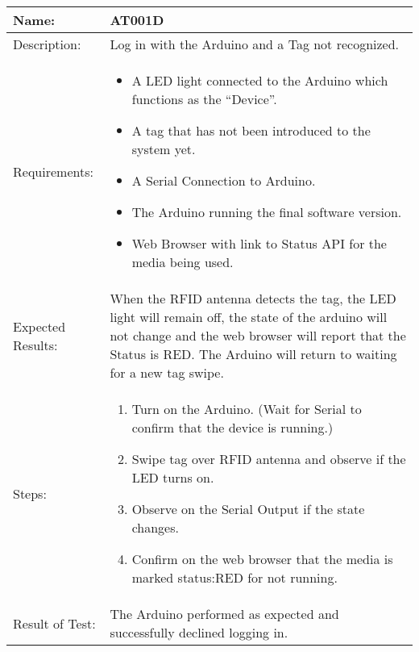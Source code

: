 \begin{table}[h]
	\centering
		\begin{tabular}{|l|p{9cm}|}
		\hline
		\hline
		Name: & AT001D\\
		\hline
		Description: & Log in with the Arduino and a Tag not recognized.\\
		\hline
		Requirements: &
		\begin{itemize}
		  \item A LED light connected to the Arduino which functions as the ``Device''.
			\item A tag that has not been introduced to the system yet.
			\item A Serial Connection to Arduino.
			\item The Arduino running the final software version.
			\item Web Browser with link to Status API for the media being used.
		\end{itemize}\\
				\hline
		Expected Results: & When the RFID antenna detects the tag, the LED light will remain off, the state of the arduino will not change and the web browser will report that the Status is RED.		
		The Arduino will return to waiting for a new tag swipe.\\
		\hline
		Steps: & 
		\begin{enumerate}
			\item Turn on the Arduino. (Wait for Serial to confirm that the device is running.)
			\item Swipe tag over RFID antenna and observe if the LED turns on.
			\item Observe on the Serial Output if the state changes.
			\item Confirm on the web browser that the media is marked status:RED for not running.
		\end{enumerate}
		\\
		\hline
		Result of Test: & The Arduino performed as expected and successfully declined logging in.\\
		\hline
		\end{tabular}
\end{table}

